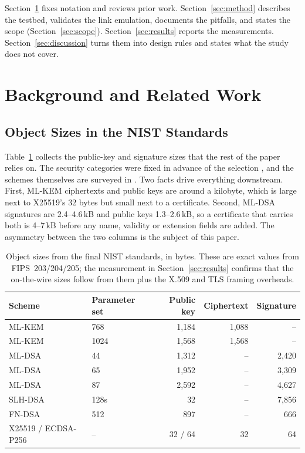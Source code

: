 \documentclass[drones,article,submit,pdftex,moreauthors]{Definitions/mdpi}
\newcommand{\mlkem}{ML-KEM}
\newcommand{\mldsa}{ML-DSA}
\newcommand{\slhdsa}{SLH-DSA}
\newcommand{\fndsa}{FN-DSA}
\newcommand{\tls}{TLS}
\begin{document}
Section~\ref{sec:background} fixes notation and reviews prior work.
Section~\ref{sec:method} describes the testbed, validates the link
emulation, documents the pitfalls, and states the scope
(Section~\ref{sec:scope}). Section~\ref{sec:results} reports the
measurements. Section~\ref{sec:discussion} turns them into design rules
and states what the study does not cover.

\section{Background and Related Work}
\label{sec:background}

\subsection{Object Sizes in the NIST Standards}

Table~\ref{tab:sizes} collects the public-key and signature sizes that
the rest of the paper relies on. The security categories were fixed in
advance of the selection \cite{nistir8105}, and the schemes themselves
are surveyed in \cite{bernstein2017,pqcryptoBook}. Two facts drive
everything downstream.
First, \mlkem{} ciphertexts and public keys are around a kilobyte, which
is large next to X25519's 32 bytes but small next to a certificate.
Second, \mldsa{} signatures are 2.4--4.6\,kB and public keys 1.3--2.6\,kB,
so a certificate that carries both is 4--7\,kB before any name,
validity or extension fields are added. The asymmetry between the two
columns is the subject of this paper.

\begin{table}[H]
\caption{Object sizes from the final NIST standards, in bytes. These are
exact values from FIPS~203/204/205; the measurement in
Section~\ref{sec:results} confirms that the on-the-wire sizes follow
from them plus the X.509 and \tls{} framing overheads.}
\label{tab:sizes}
\centering
\begin{tabular}{llrrr}
\toprule
Scheme & Parameter set & Public key & Ciphertext & Signature \\
\midrule
\mlkem{}   & 768  & 1{,}184 & 1{,}088 & -- \\
\mlkem{}   & 1024 & 1{,}568 & 1{,}568 & -- \\
\midrule
\mldsa{}   & 44   & 1{,}312 & -- & 2{,}420 \\
\mldsa{}   & 65   & 1{,}952 & -- & 3{,}309 \\
\mldsa{}   & 87   & 2{,}592 & -- & 4{,}627 \\
\midrule
\slhdsa{}  & 128s & 32      & -- & 7{,}856 \\
\fndsa{}   & 512  & 897     & -- & 666 \\
\midrule
X25519 / ECDSA-P256 & -- & 32 / 64 & 32 & 64 \\
\bottomrule
\end{tabular}
\end{table}
\end{document}
